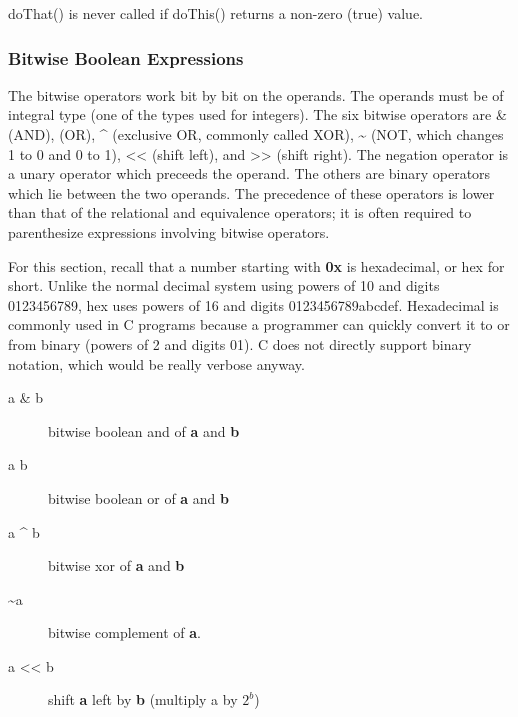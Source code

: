 doThat() is never called if doThis() returns a non-zero (true) value.

\subsubsection{Bitwise Boolean Expressions}
The bitwise operators work bit by bit on the operands. The operands must be of
integral type (one of the types used for integers). The six bitwise operators
are \& (AND), \textbar{} (OR), \^{} (exclusive OR, commonly called XOR), \~{}
(NOT, which changes 1 to 0 and 0 to 1), \textless{}\textless{} (shift left),
and \textgreater{}\textgreater{} (shift right). The negation operator is a
unary operator which preceeds the operand. The others are binary operators
which lie between the two operands. The precedence of these operators is lower
than that of the relational and equivalence operators; it is often required to
parenthesize expressions involving bitwise operators.

For this section, recall that a number starting with \textbf{0x} is
hexadecimal, or hex for short. Unlike the normal decimal system using powers of
10 and digits 0123456789, hex uses powers of 16 and digits 0123456789abcdef.
Hexadecimal is commonly used in C programs because a programmer can quickly
convert it to or from binary (powers of 2 and digits 01). C does not directly
support binary notation, which would be really verbose anyway.

\begin{description}
	\item[a \& b] bitwise boolean and of \textbf{a} and \textbf{b}
\end{description}

\begin{description}
	\item[a \textbar{} b] bitwise boolean or of \textbf{a} and \textbf{b}
\end{description}

\begin{description}
	\item[a \^{} b] bitwise xor of \textbf{a} and \textbf{b}
\end{description}

\begin{description}
	\item[\~{}a] bitwise complement of \textbf{a}.
\end{description}

\begin{description}
	\item[a \textless{}\textless{} b] shift \textbf{a} left by \textbf{b} (multiply a by \(2^b\))
\end{description}

